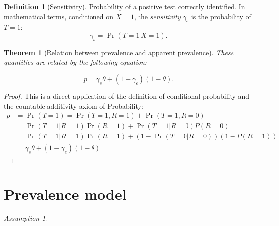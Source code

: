 \documentclass[a4paper, notitlepage, 11pt]{article}
\newtheorem{theorem}{Theorem}[]
\theoremstyle{definition}
\newtheorem{definition}{Definition}[section]
\theoremstyle{remark}
\newtheorem{assumption}{Assumption}
\begin{document}
\begin{definition}[Sensitivity]
  Probability of a positive test correctly identified. In mathematical terms,
  conditioned on $X = 1$, the {\em sensitivity} $\gamma_s$ is the probability of $T = 1$: 
  \begin{equation}
    \gamma_s = \Pr(T = 1|X = 1). 
  \end{equation} 
\end{definition}

\begin{theorem}[Relation between prevalence and apparent prevalence] These quantities are related by the following equation:

  \begin{equation}
    p = \gamma_s\theta + (1-\gamma_e)(1-\theta).
  \end{equation}
  
\end{theorem}

\begin{proof}
  This is a direct application of the definition of conditional probability
  and the countable additivity axiom of Probability:
  \begin{equation*}
    \begin{split}
      p &= \Pr(T = 1) = \Pr(T = 1, R = 1) + \Pr(T = 1, R = 0) \\
      &= \Pr(T=1|R=1)\Pr(R=1) + \Pr(T=1|R=0)P(R=0) \\
      &= \Pr(T=1|R=1)\Pr(R=1) + (1 - \Pr(T=0|R=0))(1-P(R=1)) \\
      &= \gamma_s\theta + (1 - \gamma_e)(1-\theta)
    \end{split}
  \end{equation*} 
\end{proof}


\section{Prevalence model}



\begin{assumption}

\end{assumption}







 
\end{document}
